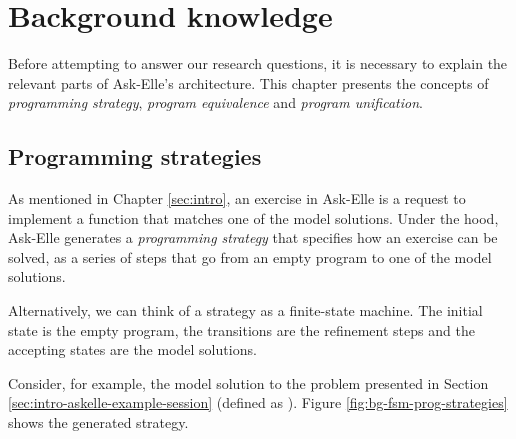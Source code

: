 \chapter{Background knowledge}
\label{sec:background}

Before attempting to answer our research questions, it is necessary to explain the relevant parts of Ask-Elle's architecture. This chapter presents the concepts of \emph{programming strategy}, \emph{program equivalence} and \emph{program unification}.

\section{Programming strategies}

As mentioned in Chapter \ref{sec:intro}, an exercise in Ask-Elle is a request to implement a function that matches one of the model solutions. Under the hood, Ask-Elle  generates a \emph{programming strategy} that specifies how an exercise can be solved, as a series of steps that go from an empty program to one of the model solutions.

Alternatively, we can think of a strategy as a finite-state machine. The initial state is the empty program, the transitions are the refinement steps and the accepting states are the model solutions.

Consider, for example, the model solution to the problem presented in Section \ref{sec:intro-askelle-example-session} (defined as ). Figure \ref{fig:bg-fsm-prog-strategies} shows the generated strategy.

